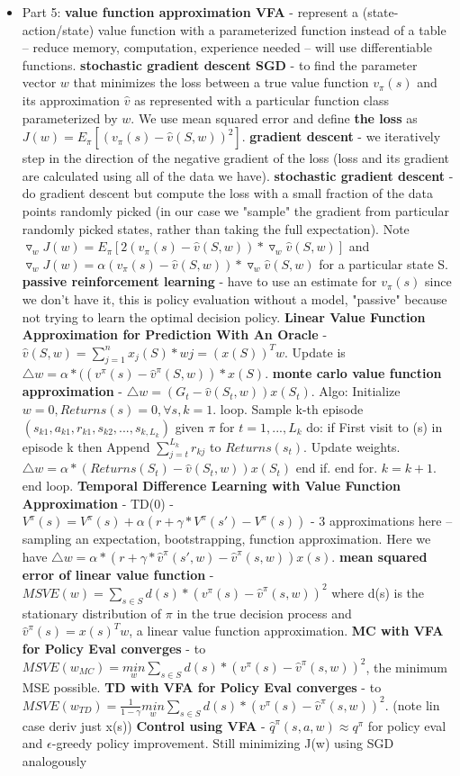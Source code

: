 \documentclass{article}
\begin{document}
\begin{itemize}
\item Part 5: \textbf{value function approximation VFA} - represent a (state-action/state) value function with a parameterized function instead of a table -- reduce memory, computation, experience needed -- will use differentiable functions. \textbf{stochastic gradient descent SGD} - to find the parameter vector $w$ that minimizes the loss between a true value function $v_\pi(s)$ and its approximation $\hat{v}$ as represented with a particular function class parameterized by $w$. We use mean squared error and define \textbf{the loss} as $J(w) = E_\pi[(v_\pi(s) - \hat{v}(S,w))^2]$. \textbf{gradient descent} - we iteratively step in the direction of the negative gradient of the loss (loss and its gradient are calculated using all of the data we have). \textbf{stochastic gradient descent} - do gradient descent but compute the loss with a small fraction of the data points randomly picked (in our case we "sample" the gradient from particular randomly picked states, rather than taking the full expectation). Note $\triangledown_w J(w) = E_\pi[2(v_\pi(s) - \hat{v}(S,w))*\triangledown_w \hat{v}(S,w)]$ and $\triangledown_w J(w) = \alpha(v_\pi(s) - \hat{v}(S,w))*\triangledown_w \hat{v}(S,w)$ for a particular state S. \textbf{passive reinforcement learning} - have to use an estimate for $v_\pi(s)$ since we don't have it, this is policy evaluation without a model, "passive" because not trying to learn the optimal decision policy. \textbf{Linear Value Function Approximation for Prediction With An Oracle} - $\hat{v}(S, w) = \sum_{j=1}^n x_j(S)*wj = (x(S))^T w$. Update is $\triangle w = \alpha*((v^\pi(s) - \hat{v}^\pi(S,w))*x(S)$. \textbf{monte carlo value function approximation} - $\triangle w = (G_t - \hat{v}(S_t, w)) x(S_t)$. Algo: Initialize $w = 0, Returns(s)=0, \forall s, k = 1$. loop. Sample k-th episode $(s_{k1}, a_{k1}, r_{k1}, s_{k2}, ..., s_{k,L_k})$ given $\pi$ for $t = 1,..., L_k$ do:  if First visit to (s) in episode k then Append $\sum_{j=t}^{L_k} r_{kj}$ to $Returns(s_t)$. Update weights. $\triangle w = \alpha*(Returns(S_t) - \hat{v}(S_t, w)) x(S_t)$ end if. end for. $k = k + 1$. end loop. \textbf{Temporal Difference Learning with Value Function Approximation} - TD(0) - $V^\pi(s) = V^\pi(s) + \alpha(r + \gamma*V^\pi(s') - V^\pi(s))$ - 3 approximations here -- sampling an expectation, bootstrapping, function approximation. Here we have $\triangle w = \alpha*(r + \gamma*\hat{v}^\pi(s', w) - \hat{v}^\pi(s, w))x(s)$. \textbf{mean squared error of linear value function} - $MSVE(w) = \sum_{s \in S} d(s)*(v^\pi(s) - \hat{v}^\pi(s, w))^2$ where d(s) is the stationary distribution of $\pi$ in the true decision process and $\hat{v}^\pi(s) = x(s)^T w$, a linear value function approximation. \textbf{MC with VFA for Policy Eval converges} - to $MSVE(w_{MC}) = \underset{w}{min} \sum_{s \in S} d(s)*(v^\pi(s) - \hat{v}^\pi(s, w))^2$, the minimum MSE possible. \textbf{TD with VFA for Policy Eval converges} - to $MSVE(w_{TD}) = \frac{1}{1-\gamma} \underset{w}{min} \sum_{s \in S} d(s)*(v^\pi(s) - \hat{v}^\pi(s, w))^2$. (note lin case deriv just x(s)) \textbf{Control using VFA} - $\hat{q}^\pi(s, a, w) \approx q^\pi$ for policy eval and $\epsilon$-greedy policy improvement. Still minimizing J(w) using SGD analogously 
\end{itemize}
\end{document}
